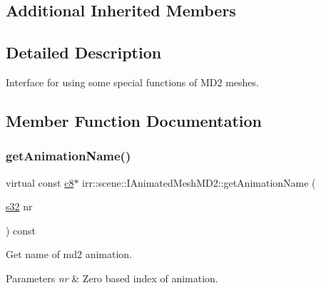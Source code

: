 \subsection*{Additional Inherited Members}


\subsection{Detailed Description}
Interface for using some special functions of M\+D2 meshes. 

\subsection{Member Function Documentation}
\mbox{\label{classirr_1_1scene_1_1IAnimatedMeshMD2_aa619158d0fc11ea1032d838abf3566ca}} 
\subsubsection{\texorpdfstring{get\+Animation\+Name()}{getAnimationName()}\hspace{0.1cm}{\footnotesize\ttfamily [1/2]}}
{\footnotesize\ttfamily virtual const \hyperlink{namespaceirr_a9395eaea339bcb546b319e9c96bf7410}{c8}$\ast$ irr\+::scene\+::\+I\+Animated\+Mesh\+M\+D2\+::get\+Animation\+Name (\begin{DoxyParamCaption}\item[{\hyperlink{namespaceirr_ac66849b7a6ed16e30ebede579f9b47c6}{s32}}]{nr }\end{DoxyParamCaption}) const\hspace{0.3cm}{\ttfamily [pure virtual]}}



Get name of md2 animation. 


\begin{DoxyParams}{Parameters}
{\em nr} & Zero based index of animation. \\
\hline
\end{DoxyParams}
\mbox{\label{classirr_1_1scene_1_1IAnimatedMeshMD2_aa619158d0fc11ea1032d838abf3566ca}} 

